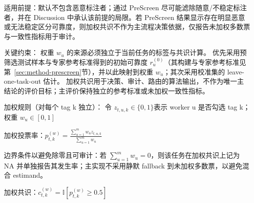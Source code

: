 适用前提：默认不包含恶意标注者；通过 PreScreen 尽可能滤除随意/不稳定标注者，并在 Discussion 中承认该前提的局限。若 PreScreen 结果显示存在明显恶意或无法稳定区分可靠度，则加权共识不作为主流程决策依据，仅报告未加权多数票与一致性指标用于审计。

关键约束：
权重 $w_u$ 的来源必须独立于当前任务的标签与共识计算。
优先采用预筛选测试样本与专家参考标准得到的初始可靠度 $r_u^{\left(0\right)}$（其构建与专家参考标准见第~\ref{sec:method-prescreen}节），并以此映射到权重 $w_u$；其次采用校准集的 leave-one-task-out 估计。
加权共识用于决策、审计、路由的算法输出，不作为唯一主结论的评价目标；主评价保持独立的参考标准或未加权一致性指标。

加权规则（对每个 tag k 独立）：
令 $z_{t,u,k}\in\{0,1\}$表示 worker u 是否勾选 tag k；权重 $w_u\in\left[0,1\right]$

加权投票率：$p_{t,k}^{\left(w\right)}=\frac{\sum_{u=1}^{m}{w_uz_{t,u,k}}}{\sum_{u=1}^{m}w_u}$

边界条件以避免除零且可审计：若 $\sum_{u=1}^{m}w_u=0$，则该任务在加权共识上记为 NA 并单独报告其发生率；主实现不采用静默 fallback 到未加权多数票，以避免混合 estimand。

加权共识：$c_{t,k}^{\left(w\right)}=\mathbb{I}\left[p_{t,k}^{\left(w\right)}\geq0.5\right]$

